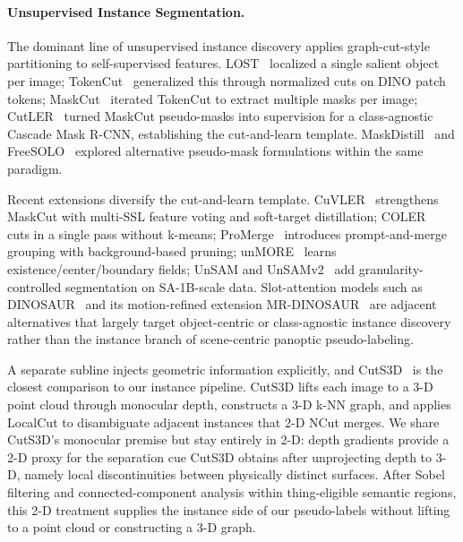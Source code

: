 \documentclass[10pt,twocolumn,letterpaper]{article}
\begin{document}
\paragraph{Unsupervised Instance Segmentation.}
The dominant line of unsupervised instance discovery applies graph-cut-style partitioning to self-supervised features. LOST~\cite{simeoni2021lost} localized a single salient object per image; TokenCut~\cite{wang2023tokencut} generalized this through normalized cuts on DINO patch tokens; MaskCut~\cite{wang2023cutler} iterated TokenCut to extract multiple masks per image; CutLER~\cite{wang2023cutler} turned MaskCut pseudo-masks into supervision for a class-agnostic Cascade Mask R-CNN, establishing the cut-and-learn template. MaskDistill~\cite{vangansbeke2022maskdistill} and FreeSOLO~\cite{wang2022freesolo} explored alternative pseudo-mask formulations within the same paradigm.

Recent extensions diversify the cut-and-learn template. CuVLER~\cite{arica2024cuvler} strengthens MaskCut with multi-SSL feature voting and soft-target distillation; COLER~\cite{feng2025coler} cuts in a single pass without k-means; ProMerge~\cite{li2024promerge} introduces prompt-and-merge grouping with background-based pruning; unMORE~\cite{yang2025unmore} learns existence/center/boundary fields; UnSAM and UnSAMv2~\cite{wang2024unsam,yu2025unsamv2} add granularity-controlled segmentation on SA-1B-scale data. Slot-attention models such as DINOSAUR~\cite{seitzer2023dinosaur} and its motion-refined extension MR-DINOSAUR~\cite{gong2025mrdinosaur} are adjacent alternatives that largely target object-centric or class-agnostic instance discovery rather than the instance branch of scene-centric panoptic pseudo-labeling.

A separate subline injects geometric information explicitly, and CutS3D~\cite{sick2025cuts3d} is the closest comparison to our instance pipeline. CutS3D lifts each image to a 3-D point cloud through monocular depth, constructs a 3-D k-NN graph, and applies LocalCut to disambiguate adjacent instances that 2-D NCut merges. We share CutS3D's monocular premise but stay entirely in 2-D: depth gradients provide a 2-D proxy for the separation cue CutS3D obtains after unprojecting depth to 3-D, namely local discontinuities between physically distinct surfaces. After Sobel filtering and connected-component analysis within thing-eligible semantic regions, this 2-D treatment supplies the instance side of our pseudo-labels without lifting to a point cloud or constructing a 3-D graph.
\end{document}

